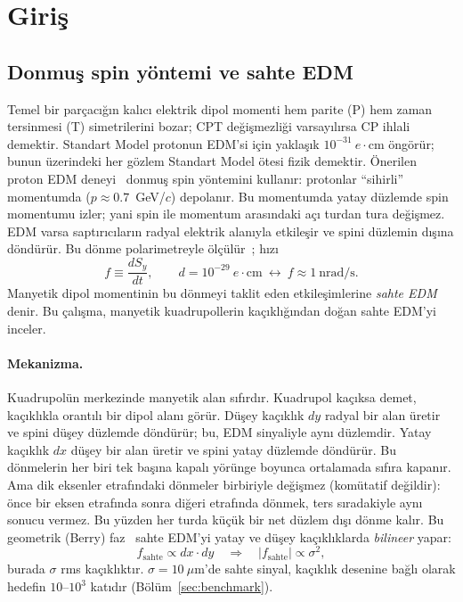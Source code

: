 \documentclass[12pt,a4paper]{extarticle}
\begin{document}
\section{Giriş}
\subsection{Donmuş spin yöntemi ve sahte EDM}
Temel bir parçacığın kalıcı elektrik dipol momenti hem parite (P) hem zaman tersinmesi (T) simetrilerini
bozar; CPT değişmezliği varsayılırsa CP ihlali demektir. Standart Model protonun EDM'si için yaklaşık
$10^{-31}~e\cdot$cm öngörür; bunun üzerindeki her gözlem Standart Model ötesi fizik demektir. Önerilen proton
EDM deneyi~\cite{srEDM,omarov} donmuş spin yöntemini kullanır: protonlar ``sihirli'' momentumda
($p\approx0.7$~GeV/$c$) depolanır. Bu momentumda yatay düzlemde spin momentumu izler; yani spin ile
momentum arasındaki açı turdan tura değişmez. EDM varsa saptırıcıların radyal elektrik alanıyla etkileşir
ve spini düzlemin dışına döndürür. Bu dönme polarimetreyle ölçülür~\cite{polarimeter}; hızı
\begin{equation}
f \equiv \frac{dS_y}{dt},\qquad d=10^{-29}~e\cdot\text{cm}\ \longleftrightarrow\ f\approx1~\text{nrad/s}.
\end{equation}
Manyetik dipol momentinin bu dönmeyi taklit eden etkileşimlerine \emph{sahte EDM} denir. Bu çalışma,
manyetik kuadrupollerin kaçıklığından doğan sahte EDM'yi inceler.

\paragraph{Mekanizma.} Kuadrupolün merkezinde manyetik alan sıfırdır. Kuadrupol kaçıksa demet,
kaçıklıkla orantılı bir dipol alanı görür. Düşey kaçıklık $dy$ radyal bir alan üretir ve spini düşey
düzlemde döndürür; bu, EDM sinyaliyle aynı düzlemdir. Yatay kaçıklık $dx$ düşey bir alan üretir ve spini
yatay düzlemde döndürür. Bu dönmelerin her biri tek başına kapalı yörünge boyunca ortalamada sıfıra
kapanır. Ama dik eksenler etrafındaki dönmeler birbiriyle değişmez (komütatif değildir): önce bir eksen
etrafında sonra diğeri etrafında dönmek, ters sıradakiyle aynı sonucu vermez. Bu yüzden her turda küçük bir
net düzlem dışı dönme kalır. Bu geometrik (Berry) faz~\cite{berry1984,aharonov1987,farley2004,haciomeroglu2019}
sahte EDM'yi yatay ve düşey kaçıklıklarda \emph{bilineer} yapar:
\begin{equation}
f_\text{sahte}\propto dx\cdot dy\quad\Rightarrow\quad|f_\text{sahte}|\propto\sigma^2,
\label{eq:sigma2}
\end{equation}
burada $\sigma$ rms kaçıklıktır. $\sigma=10~\mu$m'de sahte sinyal, kaçıklık desenine bağlı olarak hedefin
$10$--$10^3$ katıdır (Bölüm~\ref{sec:benchmark}).
\end{document}
